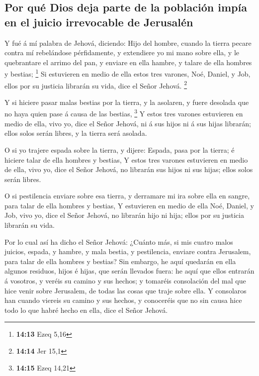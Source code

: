 \hypertarget{por-quuxe9-dios-deja-parte-de-la-poblaciuxf3n-impuxeda-en-el-juicio-irrevocable-de-jerusaluxe9n}{%
\subsection{Por qué Dios deja parte de la población impía en el juicio
irrevocable de
Jerusalén}\label{por-quuxe9-dios-deja-parte-de-la-poblaciuxf3n-impuxeda-en-el-juicio-irrevocable-de-jerusaluxe9n}}

 Y fué á mí palabra de Jehová, diciendo:  Hijo
del hombre, cuando la tierra pecare contra mí rebelándose pérfidamente,
y extendiere yo mi mano sobre ella, y le quebrantare el arrimo del pan,
y enviare en ella hambre, y talare de ella hombres y bestias;
\footnote{\textbf{14:13} Ezeq 5,16}  Si estuvieren en medio
de ella estos tres varones, Noé, Daniel, y Job, ellos por su justicia
librarán su vida, dice el Señor Jehová. \footnote{\textbf{14:14} Jer
  15,1}

 Y si hiciere pasar malas bestias por la tierra, y la
asolaren, y fuere desolada que no haya quien pase á causa de las
bestias, \footnote{\textbf{14:15} Ezeq 14,21}  Y estos tres
varones estuvieren en medio de ella, vivo yo, dice el Señor Jehová, ni á
sus hijos ni á sus hijas librarán; ellos solos serán libres, y la tierra
será asolada.

 O si yo trajere espada sobre la tierra, y dijere: Espada,
pasa por la tierra; é hiciere talar de ella hombres y bestias,
 Y estos tres varones estuvieren en medio de ella, vivo yo,
dice el Señor Jehová, no librarán sus hijos ni sus hijas; ellos solos
serán libres.

 O si pestilencia enviare sobre esa tierra, y derramare mi
ira sobre ella en sangre, para talar de ella hombres y bestias,
 Y estuvieren en medio de ella Noé, Daniel, y Job, vivo yo,
dice el Señor Jehová, no librarán hijo ni hija; ellos por su justicia
librarán su vida.

 Por lo cual así ha dicho el Señor Jehová: ¿Cuánto más, si
mis cuatro malos juicios, espada, y hambre, y mala bestia, y
pestilencia, enviare contra Jerusalem, para talar de ella hombres y
bestias?  Sin embargo, he aquí quedarán en ella algunos
residuos, hijos é hijas, que serán llevados fuera: he aquí que ellos
entrarán á vosotros, y veréis su camino y sus hechos; y tomaréis
consolación del mal que hice venir sobre Jerusalem, de todas las cosas
que traje sobre ella.  Y consolaros han cuando viereis su
camino y sus hechos, y conoceréis que no sin causa hice todo lo que
habré hecho en ella, dice el Señor Jehová.

